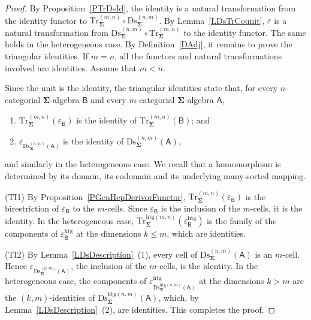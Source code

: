 \documentclass[a4paper, reqno]{amsbook}
\newcommand{\sig}[1]{\mathbf{#1}}             %
\newcommand{\calg}[1]{\boldsymbol{\mathsf{#1}}} %
\newcommand{\htg}{\mathrm{htg}}                %
\newcommand{\Ds}{\mathrm{Ds}}
\newcommand{\Tr}{\mathrm{Tr}}
\theoremstyle{plain}
\theoremstyle{definition}
\begin{document}
\begin{proof}
By Proposition~\ref{PTrDsId}, the identity is a natural transformation from the identity functor to $\Tr^{(m,n)}_{\sig{\Sigma}}\circ\Ds^{(n,m)}_{\sig{\Sigma}}$.
By Lemma~\ref{LDsTrCounit}, $\varepsilon$ is a natural transformation from $\Ds^{(n,m)}_{\sig{\Sigma}}\circ\Tr^{(m,n)}_{\sig{\Sigma}}$ to the identity functor.
The same holds in the heterogeneous case.
By Definition~\ref{DAdj}, it remains to prove the triangular identities.
If $m=n$, all the functors and natural transformations involved are identities.
Assume that $m<n$.

Since the unit is the identity, the triangular identities state that, for every $n$-categorial $\sig{\Sigma}$-algebra $\calg{B}$ and every $m$-categorial $\sig{\Sigma}$-algebra $\calg{A}$,
\begin{enumerate}
	\item[(TI1)]
	$\Tr^{(m,n)}_{\sig{\Sigma}}(\varepsilon_{\calg{B}})$ is the identity of $\Tr^{(m,n)}_{\sig{\Sigma}}(\calg{B})$; and

	\item[(TI2)]
	$\varepsilon_{\Ds^{(n,m)}_{\sig{\Sigma}}(\calg{A})}$ is the identity of $\Ds^{(n,m)}_{\sig{\Sigma}}(\calg{A})$,
\end{enumerate}
and similarly in the heterogeneous case.
We recall that a homomorphism is determined by its domain, its codomain and its underlying many-sorted mapping.

(TI1) By Proposition~\ref{PGenHepDerivorFunctor}, $\Tr^{(m,n)}_{\sig{\Sigma}}(\varepsilon_{\calg{B}})$ is the birestriction of $\varepsilon_{\calg{B}}$ to the $m$-cells.
Since $\varepsilon_{\calg{B}}$ is the inclusion of the $m$-cells, it is the identity.
In the heterogeneous case, $\Tr^{\htg(m,n)}_{\sig{\Sigma}}(\varepsilon^{\htg}_{\calg{B}})$ is the family of the components of $\varepsilon^{\htg}_{\calg{B}}$ at the dimensions $k\leq m$, which are identities.

(TI2) By Lemma~\ref{LDsDescription}~(1), every cell of $\Ds^{(n,m)}_{\sig{\Sigma}}(\calg{A})$ is an $m$-cell.
Hence $\varepsilon_{\Ds^{(n,m)}_{\sig{\Sigma}}(\calg{A})}$, the inclusion of the $m$-cells, is the identity.
In the heterogeneous case, the components of $\varepsilon^{\htg}_{\Ds^{\htg(n,m)}_{\sig{\Sigma}}(\calg{A})}$ at the dimensions $k>m$ are the $(k,m)$-identities of $\Ds^{\htg(n,m)}_{\sig{\Sigma}}(\calg{A})$, which, by Lemma~\ref{LDsDescription}~(2), are identities. This completes the proof.
\end{proof}
\end{document}
